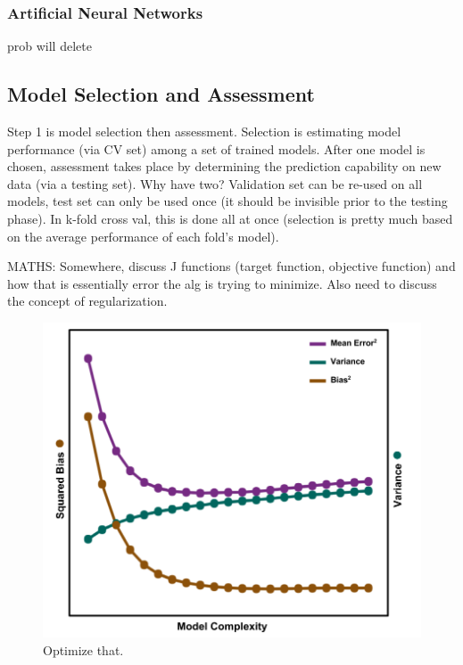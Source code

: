 \subsubsection{Artificial Neural Networks}
\label{sec:neural}

prob will delete

\subsection{Model Selection and Assessment}
\label{sec:selectass}

Step 1 is model selection then assessment. Selection is estimating model
performance (via CV set) among a set of trained models. After one model is
chosen, assessment takes place by determining the prediction capability on new
data (via a testing set).  Why have two?  Validation set can be re-used on all
models, test set can only be used once (it should be invisible prior to the
testing phase).  In k-fold cross val, this is done all at once (selection is
pretty much based on the average performance of each fold's model). 

MATHS: Somewhere, discuss J functions (target function, objective function) and
how that is essentially error the alg is trying to minimize. Also need to
discuss the concept of regularization.

\begin{figure}[!htb]
  \includegraphics[width=\linewidth]{./chapters/litrev/BVtradeoff.png}
  \caption{Optimize that.}
  \label{fig:bvtradeoff}
\end{figure}

